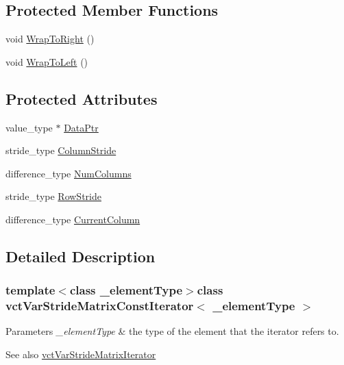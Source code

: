 \subsection*{Protected Member Functions}
\begin{DoxyCompactItemize}
\item 
void \hyperlink{classvct_var_stride_matrix_const_iterator_a55c69c6091a5bb187fde4f8be9f6a556}{Wrap\+To\+Right} ()
\item 
void \hyperlink{classvct_var_stride_matrix_const_iterator_a65882b2527bba75fdecda49476c56a1b}{Wrap\+To\+Left} ()
\end{DoxyCompactItemize}
\subsection*{Protected Attributes}
\begin{DoxyCompactItemize}
\item 
value\+\_\+type $\ast$ \hyperlink{classvct_var_stride_matrix_const_iterator_a37082ec0e45ee9d5be0b904b5bc81bb2}{Data\+Ptr}
\item 
stride\+\_\+type \hyperlink{classvct_var_stride_matrix_const_iterator_ab98d9434efbc9e7134de2fcec000a3d8}{Column\+Stride}
\item 
difference\+\_\+type \hyperlink{classvct_var_stride_matrix_const_iterator_acbbccea49ba03c2c413bffe4bb5bfa7f}{Num\+Columns}
\item 
stride\+\_\+type \hyperlink{classvct_var_stride_matrix_const_iterator_a404ec3349c14282af252a00d3b9a6290}{Row\+Stride}
\item 
difference\+\_\+type \hyperlink{classvct_var_stride_matrix_const_iterator_ab4a96221a2fbcc7005f464c24af72b5b}{Current\+Column}
\end{DoxyCompactItemize}


\subsection{Detailed Description}
\subsubsection*{template$<$class \+\_\+element\+Type$>$class vct\+Var\+Stride\+Matrix\+Const\+Iterator$<$ \+\_\+element\+Type $>$}


\begin{DoxyParams}{Parameters}
{\em \+\_\+element\+Type} & the type of the element that the iterator refers to.\\
\hline
\end{DoxyParams}
\begin{DoxySeeAlso}{See also}
\hyperlink{classvct_var_stride_matrix_iterator}{vct\+Var\+Stride\+Matrix\+Iterator} 
\end{DoxySeeAlso}


